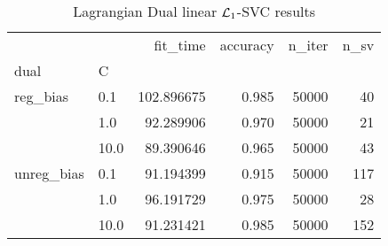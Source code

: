 \begin{table}[H]
\centering
\caption{Lagrangian Dual linear $\protect \mathcal{L}_1$-SVC results}
\label{linear_lagrangian_dual_l1_svc_cv_results}
\begin{tabular}{llrrrr}
\toprule
           &      &    fit\_time &  accuracy &  n\_iter &  n\_sv \\
dual & C &             &           &         &       \\
\midrule
reg\_bias & 0.1  &  102.896675 &     0.985 &   50000 &    40 \\
           & 1.0  &   92.289906 &     0.970 &   50000 &    21 \\
           & 10.0 &   89.390646 &     0.965 &   50000 &    43 \\
unreg\_bias & 0.1  &   91.194399 &     0.915 &   50000 &   117 \\
           & 1.0  &   96.191729 &     0.975 &   50000 &    28 \\
           & 10.0 &   91.231421 &     0.985 &   50000 &   152 \\
\bottomrule
\end{tabular}
\end{table}

